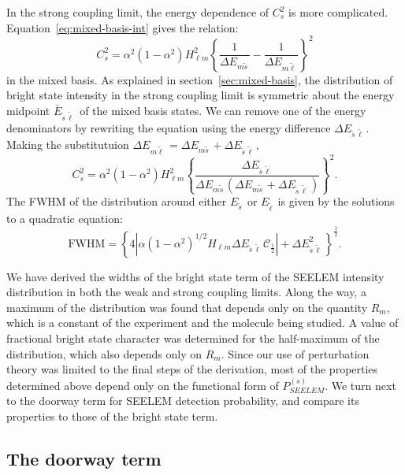 \documentclass[12pt]{mitthesis}
\newcommand{\ts}{\tilde{s}\,}
\newcommand{\tl}{\tilde{\ell}\,}
\begin{document}
In the strong coupling limit, the energy dependence of $C_s^2$ is more
complicated. Equation~\ref{eq:mixed-basis-int} gives the relation:
\begin{equation}
  C_s^2 = \alpha^2 (1-\alpha^2)H_{\ell m}^2
  \left \lbrace
    \frac{1}{\Delta E_{m \ts}} -
    \frac{1}{\Delta E_{m \tl}}
  \right \rbrace^2
\end{equation}
in the mixed basis.  As explained in section~\ref{sec:mixed-basis},
the distribution of bright state intensity in the strong coupling
limit is symmetric about the energy midpoint $\bar{E}_{\ts \tl}$ of
the mixed basis states.  We can remove one of the energy denominators
by rewriting the equation using the energy difference $\Delta E_{\ts
  \tl}$.  Making the substitutuion $\Delta E_{m \tl} = \Delta E_{m
  \ts} + \Delta E_{\ts \tl}$,
\begin{equation}
  C_s^2 = \alpha^2 (1-\alpha^2)H_{\ell m}^2
  \left \lbrace
    \frac{\Delta E_{\ts \tl}}
    {\Delta E_{m \ts}(\Delta E_{m \ts} + \Delta E_{\ts \tl})}
  \right \rbrace^2.
\end{equation}
The FWHM of the distribution around either $E_{\ts}$ or $E_{\tl}$ is
given by the solutions to a quadratic equation:
\begin{equation}
  \text{FWHM} = \left \lbrace
    4 \left \lvert
      \alpha (1-\alpha^2)^{1/2}H_{\ell m} \Delta E_{\ts \tl} 
      \mathcal{C}_{\frac{1}{2}}
      \right \rvert + \Delta E_{\ts \tl}^2
  \right \rbrace^{\frac{1}{2}}.
\end{equation}

We have derived the widths of the bright state term of the SEELEM
intensity distribution in both the weak and strong coupling limits.
Along the way, a maximum of the distribution was found that depends
only on the quantity $R_m$, which is a constant of the experiment and
the molecule being studied.  A value of fractional bright state
character was determined for the half-maximum of the distribution,
which also depends only on $R_m$.  Since our use of perturbation
theory was limited to the final steps of the derivation, most of the
properties determined above depend only on the functional form of
$P_{SEELEM}^{(s)}$.  We turn next to the doorway term for SEELEM
detection probability, and compare its properties to those of the bright state
term.

\subsection{The doorway term}
\end{document}
